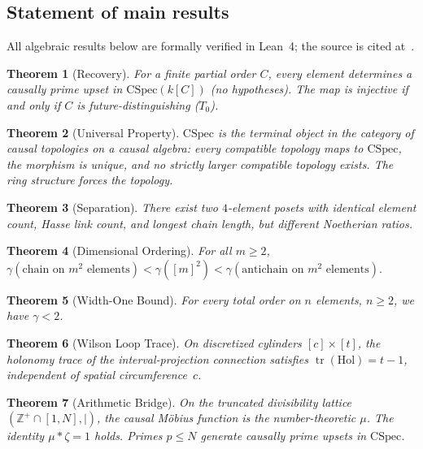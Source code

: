 \documentclass[11pt,a4paper]{article}
\theoremstyle{plain}
\newtheorem{theorem}{Theorem}[section]
\theoremstyle{definition}
\theoremstyle{remark}
\newcommand{\CSpec}{\mathrm{CSpec}}
\newcommand{\Hol}{\mathrm{Hol}}
\newcommand{\Z}{\mathbb{Z}}
\begin{document}
\subsection{Statement of main results}

All algebraic results below are formally verified in Lean~4; the source is cited at~\cite{leanrepo}.

\begin{theorem}[Recovery]\label{thm:A}
For a finite partial order $C$, every element determines a causally prime upset in $\CSpec(k[C])$ (no hypotheses). The map is injective if and only if $C$ is future-distinguishing ($T_0$).
\end{theorem}

\begin{theorem}[Universal Property]\label{thm:A2}
$\CSpec$ is the terminal object in the category of causal topologies on a causal algebra: every compatible topology maps to $\CSpec$, the morphism is unique, and no strictly larger compatible topology exists.
The ring structure forces the topology.
\end{theorem}

\begin{theorem}[Separation]\label{thm:B}
There exist two $4$-element posets with identical element count, Hasse link count, and longest chain length, but different Noetherian ratios.
\end{theorem}

\begin{theorem}[Dimensional Ordering]\label{thm:C}
For all $m \geq 2$,
$\gamma(\text{chain on $m^2$ elements}) < \gamma([m]^2) < \gamma(\text{antichain on $m^2$ elements}).$
\end{theorem}

\begin{theorem}[Width-One Bound]\label{thm:D}
For every total order on $n$ elements, $n \geq 2$, we have $\gamma < 2$.
\end{theorem}

\begin{theorem}[Wilson Loop Trace]\label{thm:E}
On discretized cylinders $[c] \times [t]$, the holonomy trace of the interval-projection connection satisfies $\operatorname{tr}(\Hol) = t - 1$, independent of spatial circumference~$c$.
\end{theorem}

\begin{theorem}[Arithmetic Bridge]\label{thm:F}
On the truncated divisibility lattice $(\Z^+ \cap [1,N], \mid)$, the causal M\"obius function is the number-theoretic $\mu$.
The identity $\mu * \zeta = 1$ holds.
Primes $p \leq N$ generate causally prime upsets in $\CSpec$.
\end{theorem}
\end{document}
